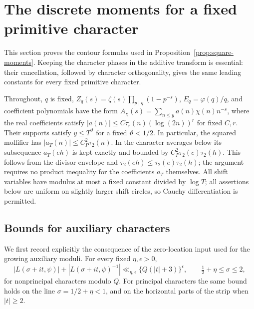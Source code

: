 \section{The discrete moments for a fixed primitive character}
\label{sec:dirichlet-moments}
This section proves the contour formulas used in
Proposition~\ref{prop:square-moments}. Keeping the character phases in
the additive transform is essential: their cancellation, followed by
character orthogonality, gives the same leading constants for every
fixed primitive character.

Throughout, $q$ is fixed, $Z_q(s)=\zeta(s)\prod_{p\mid q}(1-p^{-s})$,
$E_q=\varphi(q)/q$, and coefficient polynomials have the form
$A_\chi(s)=\sum_{n\le y}a(n)\chi(n)n^{-s}$, where the real coefficients
satisfy $|a(n)|\le C\tau_r(n)(\log(2n))^r$ for fixed $C,r$.
Their supports satisfy $y\le T^\vartheta$ for a fixed $\vartheta<1/2$.
In particular, the squared mollifier has
$|a_T(n)|\le C_P^2\tau_2(n)$. In the character averages below its
subsequence $a_T(eh)$ is kept exactly and bounded by
$C_P^2\tau_2(e)\tau_2(h)$. This follows from the divisor envelope
and $\tau_2(eh)\le\tau_2(e)\tau_2(h)$; the argument requires no
product inequality for the coefficients $a_T$ themselves.
All shift variables have modulus at most a fixed constant divided by
$\log T$; all assertions below are uniform on slightly larger shift
circles, so Cauchy differentiation is permitted.

\subsection{Bounds for auxiliary characters}
We first record explicitly the consequence of the zero-location input
used for the growing auxiliary moduli. For every fixed $\eta,\epsilon>0$,
\begin{equation}\label{eq:uniform-character-growth}
 |L(\sigma+it,\psi)|+|L(\sigma+it,\psi)^{-1}|
 \ll_{\eta,\epsilon}\{Q(|t|+3)\}^{\epsilon},
 \qquad \tfrac12+\eta\le\sigma\le2,
\end{equation}
for nonprincipal characters modulo $Q$. For principal characters the
same bound holds on the line $\sigma=1/2+\eta<1$, and on the horizontal
parts of the strip when $|t|\ge2$.

